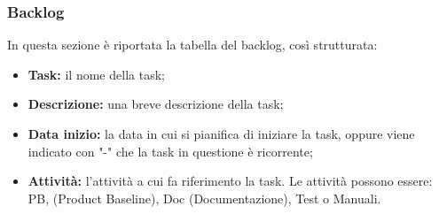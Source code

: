 \subsubsection{Backlog}
In questa sezione è riportata la tabella del backlog, così strutturata:
\begin{itemize}
    \item \textbf{Task:} il nome della task;
    \item \textbf{Descrizione:} una breve descrizione della task;
    \item \textbf{Data inizio:} la data in cui si pianifica di iniziare la task, oppure viene indicato con "-" che la task in 
    questione è ricorrente;
    \item \textbf{Attività:} l'attività a cui fa riferimento la task. Le attività possono essere: PB, (Product Baseline), Doc (Documentazione), Test o Manuali.
\end{itemize}
